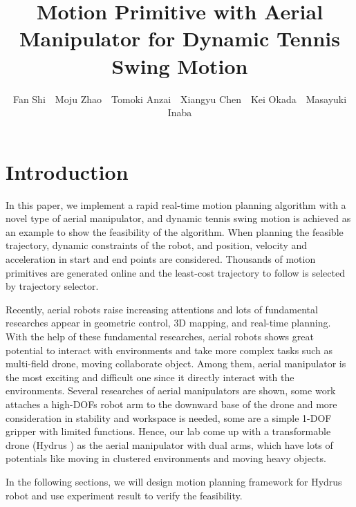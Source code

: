 \documentclass{jarticle}
\begin{document}
\title{Motion Primitive with Aerial Manipulator for Dynamic Tennis Swing Motion}
\author{Fan Shi\ \ Moju Zhao\ \ Tomoki Anzai\ \ Xiangyu Chen\ \ Kei Okada\ \ Masayuki Inaba}

\setlength{\baselineskip}{4.4mm}
\maketitle
\thispagestyle{empty}
\pagestyle{empty}

\section{Introduction}

In this paper, we implement a rapid real-time motion planning algorithm with a novel type of aerial manipulator, and dynamic tennis swing motion is achieved as an example to show the feasibility of the algorithm. When planning the feasible trajectory, dynamic constraints of the robot, and position, velocity and acceleration in start and end points are considered. Thousands of motion primitives are generated online and the least-cost trajectory to follow is selected by trajectory selector.

Recently, aerial robots raise increasing attentions and lots of fundamental researches appear in geometric control, 3D mapping,  and real-time planning. With the help of these fundamental researches, aerial robots shows great potential to interact with environments and take more complex tasks such as multi-field drone, moving collaborate object. Among them, aerial manipulator is the most exciting and difficult one since it directly interact with the environments. Several researches of aerial manipulators are shown, some work attaches a high-DOFs robot arm to the downward base of the drone and more consideration in stability and workspace is needed\cite{aerial_manipulator_1}, some are a simple 1-DOF gripper with limited functions\cite{aerial_manipulator_2}. Hence, our lab come up with a transformable drone (Hydrus ) as the aerial manipulator with dual arms, which have lots of potentials like moving in clustered environments and moving heavy objects\cite{zhao_ar}.

In the following sections, we will design motion planning framework for Hydrus robot and use experiment result to verify the feasibility.
\end{document}
